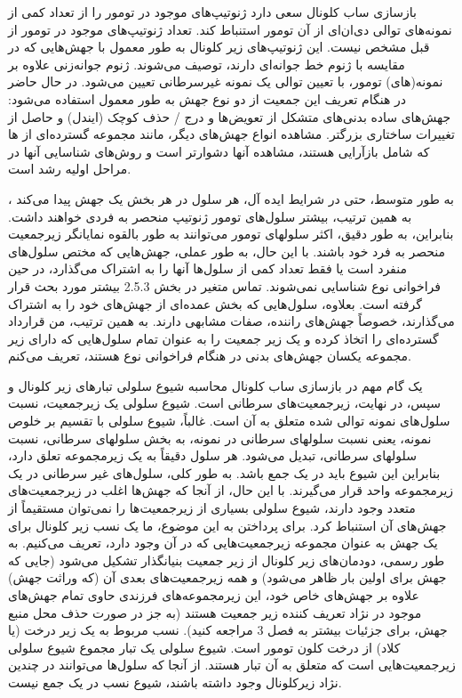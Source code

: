 بازسازی ساب کلونال سعی دارد ژنوتیپ‌های موجود در تومور را از تعداد کمی از نمونه‌های توالی دی‌ان‌ای از آن تومور استنباط کند. تعداد ژنوتیپ‌های موجود در تومور از قبل مشخص نیست. این ژنوتیپ‌های زیر کلونال به طور معمول با جهش‌هایی که در مقایسه با ژنوم خط جوانه‌ای دارند، توصیف می‌شوند. ژنوم جوانه‌زنی علاوه بر نمونه(های) تومور، با تعیین توالی یک نمونه غیرسرطانی تعیین می‌شود. در حال حاضر در هنگام تعریف این جمعیت از دو نوع جهش به طور معمول استفاده می‌شود: جهش‌های ساده بدنی‌های متشکل از تعویض‌ها و درج / حذف کوچک (ایندل) و  حاصل از تغییرات ساختاری بزرگتر. مشاهده انواع جهش‌های دیگر، مانند مجموعه گسترده‌ای از ‌ها که شامل بازآرایی هستند، مشاهده آنها دشوارتر است و روش‌های شناسایی آنها در مراحل اولیه رشد است.


به طور متوسط، حتی در شرایط ایده آل، هر سلول در هر بخش یک جهش پیدا می‌کند \cite{behjati2014genome}، به همین ترتیب، بیشتر سلول‌های تومور ژنوتیپ منحصر به فردی خواهند داشت. بنابراین، به طور دقیق، اکثر سلولهای تومور می‌توانند به طور بالقوه نمایانگر زیرجمعیت منحصر به فرد خود باشند. با این حال، به طور عملی، جهش‌هایی که مختص سلول‌های منفرد است یا فقط تعداد کمی از سلول‌ها آنها را به اشتراک می‌گذارد، در حین فراخوانی نوع شناسایی نمی‌شوند. تماس متغیر در بخش 2.5.3 بیشتر مورد بحث قرار گرفته است. بعلاوه، سلول‌هایی که بخش عمده‌ای از جهش‌های خود را به اشتراک می‌گذارند، خصوصاً جهش‌های راننده، صفات مشابهی دارند. به همین ترتیب، من قرارداد گسترده‌ای را اتخاذ کرده و یک زیر جمعیت را به عنوان تمام سلول‌هایی که دارای زیر مجموعه یکسان جهش‌های بدنی در هنگام فراخوانی نوع هستند، تعریف می‌کنم.


یک گام مهم در بازسازی ساب کلونال محاسبه شیوع سلولی تبارهای زیر کلونال و سپس، در نهایت، زیرجمعیت‌های سرطانی است. شیوع سلولی یک زیرجمعیت، نسبت سلول‌های نمونه توالی شده متعلق به آن است. غالباً، شیوع سلولی با تقسیم بر خلوص نمونه، یعنی نسبت سلولهای سرطانی در نمونه، به بخش سلولهای سرطانی، نسبت سلولهای سرطانی، تبدیل می‌شود. هر سلول دقیقاً به یک زیرمجموعه تعلق دارد، بنابراین این شیوع باید در یک جمع باشد. به طور کلی، سلول‌های غیر سرطانی در یک زیرمجموعه واحد قرار می‌گیرند. با این حال، از آنجا که جهش‌ها اغلب در زیرجمعیت‌های متعدد وجود دارند، شیوع سلولی بسیاری از زیرجمعیت‌ها را نمی‌توان مستقیماً از جهش‌های آن استنباط کرد. برای پرداختن به این موضوع، ما یک نسب زیر کلونال برای یک جهش به عنوان مجموعه زیرجمعیت‌هایی که در آن وجود دارد، تعریف می‌کنیم. به طور رسمی، دودمان‌های زیر کلونال از زیر جمعیت بنیانگذار تشکیل می‌شود (جایی که جهش برای اولین بار ظاهر می‌شود) و همه زیرجمعیت‌های بعدی آن (که وراثت جهش) علاوه بر جهش‌های خاص خود، این زیرمجموعه‌های فرزندی حاوی تمام جهش‌های موجود در نژاد تعریف کننده زیر جمعیت هستند (به جز در صورت حذف محل منبع جهش، برای جزئیات بیشتر به فصل 3 مراجعه کنید). نسب مربوط به یک زیر درخت (یا کلاد) از درخت کلون تومور است. شیوع سلولی یک تبار مجموع شیوع سلولی زیرجمعیت‌هایی است که متعلق به آن تبار هستند. از آنجا که سلول‌ها می‌توانند در چندین نژاد زیرکلونال وجود داشته باشند، شیوع نسب در یک جمع نیست.



